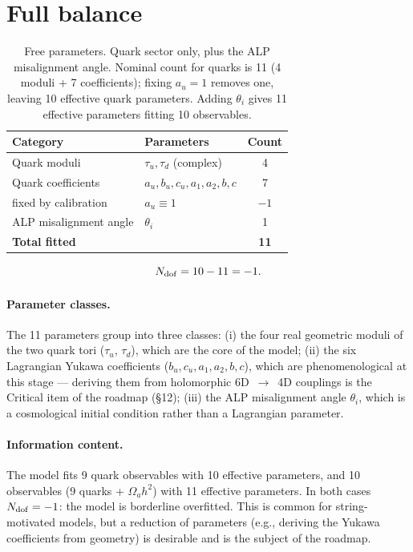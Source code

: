 \documentclass[12pt,a4paper]{article}
\numberwithin{equation}{section}
\begin{document}
\section{Full balance}
\label{sec:balance}

\begin{table}[H]
\centering
\caption{Free parameters. Quark sector only, plus the ALP
misalignment angle. Nominal count for quarks is 11 (4 moduli + 7
coefficients); fixing \(a_u=1\) removes one, leaving 10 effective
quark parameters. Adding \(\theta_i\) gives 11 effective parameters
fitting 10 observables.}
\begin{tabular}{llc}
\toprule
Category & Parameters & Count \\
\midrule
Quark moduli & \(\tau_u, \tau_d\) (complex) & 4 \\
Quark coefficients & \(a_u, b_u, c_u, a_1, a_2, b, c\) & 7 \\
\quad fixed by calibration & \(a_u \equiv 1\) & \(-1\) \\
ALP misalignment angle & \(\theta_i\) & 1 \\
\midrule
\textbf{Total fitted} & & \textbf{11} \\
\bottomrule
\end{tabular}
\end{table}

\begin{equation}
N_{\rm dof} = 10 - 11 = -1.
\end{equation}

\paragraph{Parameter classes.}
The 11 parameters group into three classes:
(i) the four real geometric moduli of the two quark tori
(\(\tau_u\), \(\tau_d\)), which are the core of the model;
(ii) the six Lagrangian Yukawa coefficients
(\(b_u, c_u, a_1, a_2, b, c\)), which are phenomenological at this stage
--- deriving them from holomorphic 6D~$\to$~4D couplings is the
Critical item of the roadmap (\S12);
(iii) the ALP misalignment angle \(\theta_i\), which is a cosmological
initial condition rather than a Lagrangian parameter.

\paragraph{Information content.}
The model fits 9 quark observables with 10 effective parameters, and
10 observables (9 quarks + \(\Omega_a h^2\)) with 11 effective
parameters. In both cases \(N_{\rm dof} = -1\): the model is
borderline overfitted. This is common for string-motivated models,
but a reduction of parameters (e.g., deriving the Yukawa coefficients
from geometry) is desirable and is the subject of the roadmap.
\end{document}
